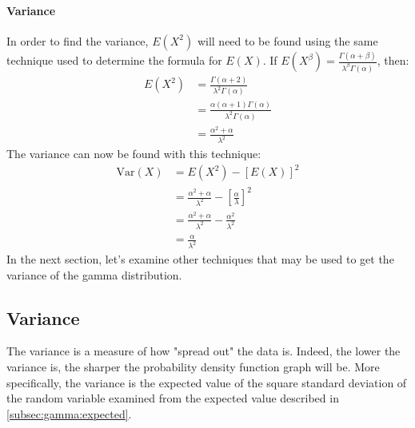 \documentclass[12pt]{article}
\begin{document}
\paragraph{Variance}
In order to find the variance, $E(X^2)$ will need to be found using the same technique used to determine the formula for
$E(X)$. If $E(X^\beta) = \frac{\Gamma(\alpha+\beta)}{\lambda^\beta \Gamma(\alpha)}$, then:
\begin{equation}
	\begin{split}
		E(X^2)	&=	\frac{\Gamma(\alpha+2)}{\lambda^2 \Gamma(\alpha)}\\
				&=	\frac{\alpha(\alpha+1)\Gamma(\alpha)}{\lambda^2 \Gamma(\alpha)}\\
				&=	\frac{\alpha^2+\alpha}{\lambda^2}
	\end{split}
\end{equation}
The variance can now be found with this technique:
\begin{equation}
	\begin{split}
		\text{Var}(X)	&=	E(X^2) - [E(X)]^2\\
						&=	\frac{\alpha^2+\alpha}{\lambda^2} - \left[\frac{\alpha}{\lambda}\right]^2\\
						&=	\frac{\alpha^2+\alpha}{\lambda^2} - \frac{\alpha^2}{\lambda^2}\\
						&=	\frac{\alpha}{\lambda^2}
	\end{split}
\end{equation}
In the next section, let's examine other techniques that may be used to get the variance of the gamma distribution.


\pagebreak
\subsection{Variance}\label{subsec:gamma:variance}
The variance is a measure of how "spread out" the data is. Indeed, the lower the variance is, the sharper the
probability density function graph will be. More specifically, the variance is the expected value of the square standard
deviation of the random variable examined from the expected value described in
\autoref{subsec:gamma:expected}\cite{wikipediaVariance2022}.
\end{document}
